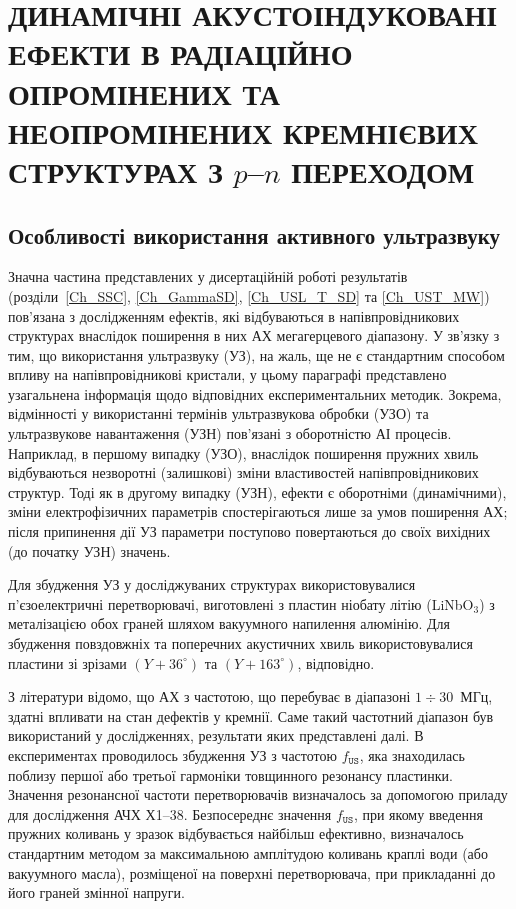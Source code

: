 
\chapter{\MakeUppercase{Динамічні акустоіндуковані ефекти в радіаційно опромінених та неопромінених кремнієвих структурах з} $p$--$n$ \MakeUppercase{переходом}\label{Ch_SSC}}


\section{Особливості використання активного ультразвуку}
Значна частина представлених у дисертаційній роботі результатів (розділи~\ref{Ch_SSC}, \ref{Ch_GammaSD}, \ref{Ch_USL_T_SD} та \ref{Ch_UST_MW}) пов'язана з дослідженням ефектів, які відбуваються в напівпровідникових структурах внаслідок
поширення в них АХ мегагерцевого діапазону.
У зв'язку з тим, що використання ультразвуку (УЗ), на жаль, ще не є стандартним способом впливу на напівпровідникові кристали,
у цьому параграфі представлено узагальнена  інформація щодо відповідних експериментальних методик.
Зокрема,
відмінності у використанні термінів ультразвукова обробки (УЗО) та ультразвукове навантаження (УЗН) пов'язані з оборотністю АІ процесів.
Наприклад, в першому випадку (УЗО), внаслідок поширення пружних хвиль відбуваються незворотні (залишкові) зміни властивостей напівпровідникових структур.
Тоді як в другому випадку (УЗН), ефекти є оборотніми (динамічними), зміни електрофізичних параметрів спостерігаються лише за умов поширення АХ;
після припинення дії УЗ параметри поступово повертаються до своїх вихідних (до початку УЗН) значень.

Для збудження УЗ у досліджуваних структурах використовувалися п'єзоелектричні перетворювачі,
виготовлені з пластин ніобату літію (LiNbO$_3$) з металізацією обох граней шляхом вакуумного напилення алюмінію.
Для збудження повздовжніх та поперечних акустичних хвиль використовувалися пластини зі зрізами $(Y\!+\!36^\circ)$ та $(Y\!+\!163^\circ)$, відповідно.

З літератури \cite{Ostapenko1995,Davletova2008,Davletova2009,Pashaev2014r} відомо, що АХ з частотою, що перебуває в діапазоні $1\div30$~МГц, здатні впливати на стан дефектів у кремнії.
Саме такий частотний діапазон був використаний у дослідженнях, результати яких представлені далі.
В експериментах проводилось збудження УЗ з частотою $f_\mathtt{US}$, яка знаходилась поблизу першої або третьої гармоніки товщинного резонансу пластинки.
Значення резонансної частоти перетворювачів визначалось за допомогою приладу для дослідження АЧХ Х1--38.
Безпосереднє значення $f_\mathtt{US}$, при якому введення пружних коливань у зразок відбувається найбільш ефективно, визначалось стандартним методом за максимальною амплітудою коливань краплі води (або вакуумного масла), розміщеної на поверхні перетворювача, при прикладанні до його граней змінної напруги.

